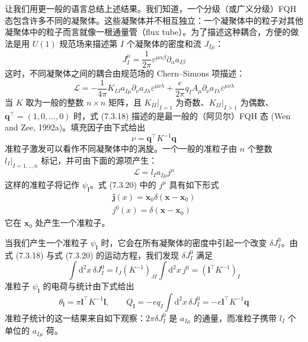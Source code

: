 让我们用更一般的语言总结上述结果。我们知道，一个分级（或广义分级）FQH 态包含许多不同的凝聚体。这些凝聚体并不相互独立：一个凝聚体中的粒子对其他凝聚体中的粒子而言就像一根通量管（flux tube）。为了描述这种耦合，方便的做法是用 $U(1)$ 规范场来描述第 $I$ 个凝聚体的密度和流 $J_{I\mu}$：
\begin{equation*}
J_{I}^{\mu}=\frac{1}{2\pi}\varepsilon^{\mu\alpha\beta}\partial_{\alpha}a_{I\beta} \tag{7.3.17}
\end{equation*}
这时，不同凝聚体之间的耦合由规范场的 Chern--Simons 项描述：
\begin{equation*}
\mathcal{L}=-\frac{1}{4\pi}K_{IJ}a_{I\mu}\partial_{\nu}a_{J\lambda}\varepsilon^{\mu\nu\lambda}
+\frac{e}{2\pi}q_{I}A_{\mu}\partial_{\nu}a_{I\lambda}\varepsilon^{\mu\nu\lambda} \tag{7.3.18}
\end{equation*}
当 $K$ 取为一般的整数 $n\times n$ 矩阵，且 $K_{II}|_{I=1}$ 为奇数、$K_{II}|_{I>1}$ 为偶数、$\boldsymbol{q}^{\top}=(1,0,\ldots,0)$ 时，式 (7.3.18) 描述的是最一般的（阿贝尔）FQH 态 (Wen and Zee, 1992a)。填充因子由下式给出
\begin{equation*}
\nu=\boldsymbol{q}^{\top}K^{-1}\boldsymbol{q} \tag{7.3.19}
\end{equation*}
准粒子激发可以看作不同凝聚体中的涡旋。一个一般的准粒子由 $n$ 个整数 $l_{I}|_{I=1,..,n}$ 标记，并可由下面的源项产生：
\begin{equation*}
\mathcal{L}=l_{I}a_{I\mu}j^{\mu} \tag{7.3.20}
\end{equation*}
这样的准粒子将记作 $\psi_{\pmb{l}}$。式 (7.3.20) 中的 $j^{\mu}$ 具有如下形式
\begin{gather*}
\pmb{j}(x)=\dot{\pmb{x}}_{0}\delta(\pmb{x}-\pmb{x}_{0})\\
j^{0}(x)=\delta(\pmb{x}-\pmb{x}_{0}) \tag{7.3.21}
\end{gather*}
它在 $\pmb{x}_{0}$ 处产生一个准粒子。

当我们产生一个准粒子 $\psi_{\pmb{l}}$ 时，它会在所有凝聚体的密度中引起一个改变 $\delta J_{I}^{0}$。由式 (7.3.18) 与式 (7.3.20) 的运动方程，我们发现 $\delta J_{I}^{0}$ 满足
\begin{equation*}
\int\mathrm{d}^{2}x\,\delta J_{I}^{0}
=l_{J}(K^{-1})_{JI}\int\mathrm{d}^{2}x\,j^{0}=(\pmb{l}^{\top}K^{-1})_{I} \tag{7.3.22}
\end{equation*}
准粒子 $\psi_{\pmb{l}}$ 的电荷与统计由下式给出
\begin{equation*}
\theta_{\pmb{l}}=\pi\pmb{l}^{\top}K^{-1}\pmb{l},\qquad
Q_{\pmb{l}}=-e q_{I}\int\mathrm{d}^{2}x\,\delta J_{I}^{0}=-e\pmb{l}^{\top}K^{-1}\boldsymbol{q} \tag{7.3.23}
\end{equation*}
准粒子统计的这一结果来自如下观察：$2\pi\delta J_{I}^{0}$ 是 $a_{I\mu}$ 的通量，而准粒子携带 $l_{I}$ 个单位的 $a_{I\mu}$ 荷。


